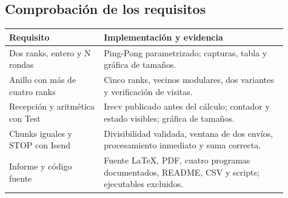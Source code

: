 \documentclass[11pt,letterpaper]{article}
\newcommand{\subheading}[1]{\subsection{\textcolor{azul}{#1}}}
\begin{document}
\subheading{Comprobación de los requisitos}
\begin{center}\small
\begin{tabular}{@{}L{0.31\linewidth}L{0.60\linewidth}@{}}
\toprule
\textbf{Requisito} & \textbf{Implementación y evidencia}\\
\midrule
Dos ranks, entero y N rondas & Ping-Pong parametrizado; capturas, tabla y gráfica de tamaños.\\
Anillo con más de cuatro ranks & Cinco ranks, vecinos modulares, dos variantes y verificación de visitas.\\
Recepción y aritmética con Test & Irecv publicado antes del cálculo; contador y estado visibles; gráfica de tamaños.\\
Chunks iguales y STOP con Isend & Divisibilidad validada, ventana de dos envíos, procesamiento inmediato y suma correcta.\\
Informe y código fuente & Fuente LaTeX, PDF, cuatro programas documentados, README, CSV y scripts; ejecutables excluidos.\\
\bottomrule
\end{tabular}\end{center}
\end{document}
